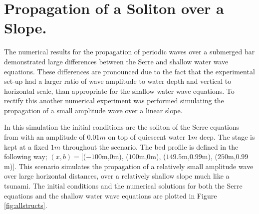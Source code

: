 \documentclass[a4paper,fleqn]{article} %
\begin{document}
\section{Propagation of a Soliton over a Slope.}
\label{Soliton up a Slope}
The numerical results for the propagation of periodic waves over a submerged bar demonstrated large differences between the Serre and shallow water wave equations. These differences are pronounced due to the fact that the experimental set-up had a larger ratio of wave amplitude to water depth and vertical to horizontal scale, than appropriate for the shallow water wave equations. To rectify this another numerical experiment was performed simulating the propagation of a small amplitude wave over a linear slope.  

In this simulation the initial conditions are the soliton of the Serre equations from \cite{El-etal-2006} with an amplitude of $0.01m$ on top of quiescent water $1m$ deep. The stage is kept at a fixed $1m$ throughout the scenario. The bed profile is defined in the following way; $(x,b) = [$($-100$m,$0$m), ($100$m,$0$m), ($149.5$m,$0.99$m), ($250$m,$0.99$m)$]$. This scenario simulates the propagation of a relatively small amplitude wave over large horizontal distances, over a relatively shallow slope much like a tsunami. The initial conditions and the numerical solutions for both the Serre equations and the shallow water wave equations are plotted in Figure \ref{fig:allstructs}.
\end{document}

